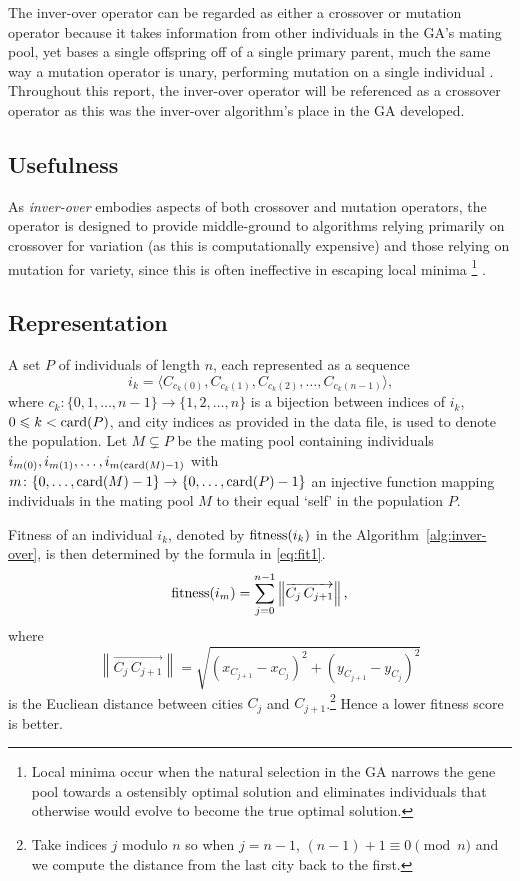 The inver-over operator can be regarded as either a crossover or mutation 
operator because it takes information from other individuals in the GA's
mating pool, yet bases a single offspring off of a single primary parent, much 
the same way a mutation operator is unary, performing mutation on a single
individual \cite{p44}. Throughout this report, the inver-over operator will 
be referenced as a crossover operator as this was the inver-over 
algorithm's place in the GA developed.

\subsection{Usefulness}
As {\em inver-over} embodies aspects of both crossover and mutation 
operators, the operator  is designed to provide middle-ground to 
algorithms relying primarily on crossover for variation (as this is 
computationally expensive) and those relying on mutation for variety,
since this is often ineffective in escaping local minima%
\footnote{Local minima occur when the natural selection in the GA 
	narrows the gene pool towards a ostensibly optimal solution and 
	eliminates individuals that otherwise would evolve to become the 
	true optimal solution.} \cite{p44}.


\subsection{Representation}
A set $P$ of individuals of length $n$, each represented as a sequence
\begin{equation*}
i_k = \langle C_{c_k(0)}, C_{c_k(1)}, C_{c_k(2)}, \ldots, C_{c_k(n-1)} \rangle\text{,}
\end{equation*}
where $c_k\colon \{0, 1, \ldots, n-1\} \to \{ 1, 2, \ldots, n \}$ is a bijection 
between indices of $i_k$, $0 \leqslant k < \operatorname{card}(P)$, and city indices as 
provided in the data file, is used to denote the population. Let 
$M \subsetneq P$ be the mating pool containing individuals 
$i_{m(0)}, i_{m(1)},\ldots, i_{m(\operatorname{card}(M)-1)}$ with $m\colon 
\{0, \ldots, \operatorname{card}(M)-1\} \to \{0, \ldots, \operatorname{card}(P) -1\}$
 an injective function mapping individuals in the mating pool $M$ to 
their equal `self' in the population $P$.

Fitness of an individual $i_k$, denoted by $\operatorname{fitness}(i_k)$ in the Algorithm~\ref{alg:inver-over}, is then determined by the formula in 
\eqref{eq:fit1}.
\begin{equation}
\operatorname{fitness}(i_m) = \sum_{j=0}^{n-1} \left\lVert \overrightarrow{C_j \, C_{j+1}} \right\rVert\text{,} \label{eq:fit1} 
\end{equation}
where 
\begin{equation*}
\left\lVert \overrightarrow{C_j \, C_{j+1}} \right\rVert = \sqrt{(x_{C_{j+1}} - x_{C_j})^2 + (y_{C_{j+1}} - y_{C_j})^2}
\end{equation*}
is the Eucliean distance between cities $C_j$ and $C_{j+1}$.\footnote{
	Take indices $j$ modulo $n$ so when $j=n-1$, $(n-1)+1  \equiv 0 \pmod n$
	 and we compute the distance from the last city back to the first.} Hence
a lower fitness score is better.

